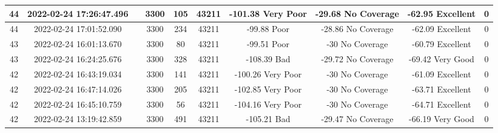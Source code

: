 \begin{longtable*}{|c|c|c|c|c|c|c|c|c|c|}
44&2022-02-24 17:26:47.496&&3300&105&43211& -101.38   Very Poor   & -29.68    No Coverage & -62.95    Excellent   & 0\\\hline
{}44&2022-02-24 17:01:52.090&&3300&234&43211& -99.88    Poor        & -28.86    No Coverage & -62.09    Excellent   & 0\\\hline
{}43&2022-02-24 16:01:13.670&&3300&80&43211& -99.51    Poor        & -30       No Coverage & -60.79    Excellent   & 0\\\hline
{}43&2022-02-24 16:24:25.676&&3300&328&43211& -108.39   Bad         & -29.72    No Coverage & -69.42    Very Good   & 0\\\hline
{}42&2022-02-24 16:43:19.034&&3300&141&43211& -100.26   Very Poor   & -30       No Coverage & -61.09    Excellent   & 0\\\hline
{}42&2022-02-24 16:47:14.026&&3300&205&43211& -102.85   Very Poor   & -30       No Coverage & -63.71    Excellent   & 0\\\hline
{}42&2022-02-24 16:45:10.759&&3300&56&43211& -104.16   Very Poor   & -30       No Coverage & -64.71    Excellent   & 0\\\hline
{}42&2022-02-24 13:19:42.859&&3300&491&43211& -105.21   Bad         & -29.47    No Coverage & -66.19    Very Good   & 0\\\hline

\end{longtable*}
